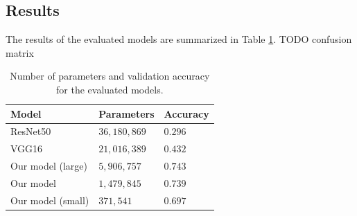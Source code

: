 \documentclass{article}
\begin{document}
\subsection{Results}
The results of the evaluated models are summarized in Table \ref{tab:results}. TODO confusion matrix
\begin{table}
  \centering
  \begin{tabular}{ |p{3cm}||p{2cm}|p{2cm}| }
    \hline
    Model & Parameters & Accuracy\\
    \hline
    ResNet50 & $36,180,869$ & $0.296$\\
    \hline
    VGG16 & $21,016,389$ & $0.432$\\
    \hline
    Our model (large) & $5,906,757$ & $0.743$\\
    \hline
    Our model & $1,479,845$ & $0.739$\\
    \hline
    Our model (small) & $371,541$ & $0.697$\\
    \hline
  \end{tabular}
  \caption{Number of parameters and validation accuracy for the evaluated models.}
  \label{tab:results}
\end{table}



\end{document}
